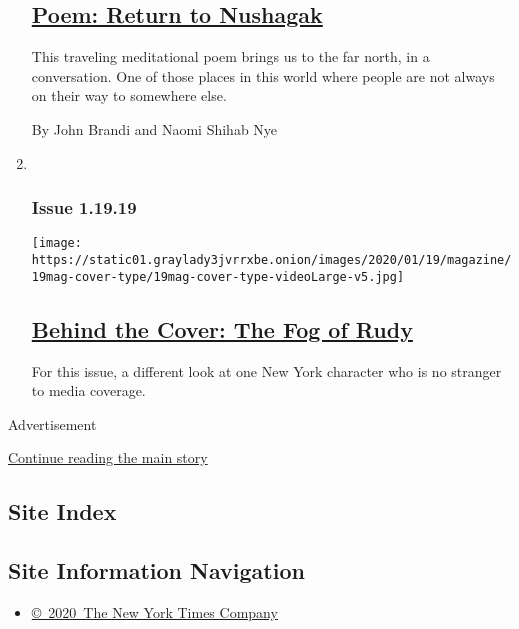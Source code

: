 \begin{enumerate}
{  \subsection{\texorpdfstring{\href{/2020/01/16/magazine/poem-return-to-nushagak.html}{Poem:
  Return to
  Nushagak}}{Poem: Return to Nushagak}}\label{poem-return-to-nushagak}}

  This traveling meditational poem brings us to the far north, in a
  conversation. One of those places in this world where people are not
  always on their way to somewhere else.~

  By John Brandi and Naomi Shihab Nye
\item ~
  \hypertarget{issue-11919}{%
  \subsubsection{Issue 1.19.19}\label{issue-11919}}

  \texttt{[image: https://static01.graylady3jvrrxbe.onion/images/2020/01/19/magazine/19mag-cover-type/19mag-cover-type-videoLarge-v5.jpg]}

  \hypertarget{behind-the-cover-the-fog-of-rudy}{%
  \subsection{\texorpdfstring{\href{/2020/01/16/magazine/behind-the-cover-the-fog-of-rudy.html}{Behind
  the Cover: The Fog of
  Rudy}}{Behind the Cover: The Fog of Rudy}}\label{behind-the-cover-the-fog-of-rudy}}

  For this issue, a different look at one New York character who is no
  stranger to media coverage.~
\end{enumerate}

Advertisement

\protect\hyperlink{after-mid1}{Continue reading the main story}

\hypertarget{site-index}{%
\subsection{Site Index}\label{site-index}}

\hypertarget{site-information-navigation}{%
\subsection{Site Information
Navigation}\label{site-information-navigation}}

\begin{itemize}
\tightlist
\item
  \href{https://help.nytimes3xbfgragh.onion/hc/en-us/articles/115014792127-Copyright-notice}{©~2020~The
  New York Times Company}
\end{itemize}

